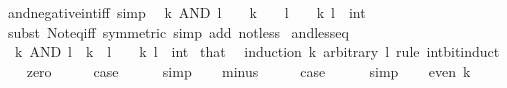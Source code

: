\begin{isabellebody}
\isamarkupfalse%
%
\endisatagproof
{\isafoldproof}%
%
\isadelimproof
\isanewline
%
\endisadelimproof
\isanewline
{}\isamarkupfalse%
\ and{\isacharunderscore}{\kern0pt}negative{\isacharunderscore}{\kern0pt}int{\isacharunderscore}{\kern0pt}iff\ {\isacharbrackleft}{\kern0pt}simp{\isacharbrackright}{\kern0pt}{\isacharcolon}{\kern0pt}\isanewline
\ \ {\isacartoucheopen}k\ AND\ l\ {\isacharless}{\kern0pt}\ {}\ {\isasymlongleftrightarrow}\ k\ {\isacharless}{\kern0pt}\ {}\ {\isasymand}\ l\ {\isacharless}{\kern0pt}\ {}{\isacartoucheclose}\ \ k\ l\ {\isacharcolon}{\kern0pt}{\isacharcolon}{\kern0pt}\ int\isanewline
%
\isadelimproof
\ \ %
\endisadelimproof
%
\isatagproof
{}\isamarkupfalse%
\ {\isacharparenleft}{\kern0pt}subst\ Not{\isacharunderscore}{\kern0pt}eq{\isacharunderscore}{\kern0pt}iff\ {\isacharbrackleft}{\kern0pt}symmetric{\isacharbrackright}{\kern0pt}{\isacharparenright}{\kern0pt}\ {\isacharparenleft}{\kern0pt}simp\ add{\isacharcolon}{\kern0pt}\ not{\isacharunderscore}{\kern0pt}less{\isacharparenright}{\kern0pt}%
\endisatagproof
{\isafoldproof}%
%
\isadelimproof
\isanewline
%
\endisadelimproof
\isanewline
{}\isamarkupfalse%
\ and{\isacharunderscore}{\kern0pt}less{\isacharunderscore}{\kern0pt}eq{\isacharcolon}{\kern0pt}\isanewline
\ \ {\isacartoucheopen}k\ AND\ l\ {\isasymle}\ k{\isacartoucheclose}\ \ {\isacartoucheopen}l\ {\isacharless}{\kern0pt}\ {}{\isacartoucheclose}\ \ k\ l\ {\isacharcolon}{\kern0pt}{\isacharcolon}{\kern0pt}\ int\isanewline
%
\isadelimproof
%
\endisadelimproof
%
\isatagproof
{}\isamarkupfalse%
\ that\ \isamarkupfalse%
\ {\isacharparenleft}{\kern0pt}induction\ k\ arbitrary{\isacharcolon}{\kern0pt}\ l\ rule{\isacharcolon}{\kern0pt}\ int{\isacharunderscore}{\kern0pt}bit{\isacharunderscore}{\kern0pt}induct{\isacharparenright}{\kern0pt}\isanewline
\ \ \isamarkupfalse%
\ zero\isanewline
\ \ \isamarkupfalse%
\ \isamarkupfalse%
\ {\isacharquery}{\kern0pt}case\isanewline
\ \ \ \ \isamarkupfalse%
\ simp\isanewline
{}\isamarkupfalse%
\isanewline
\ \ \isamarkupfalse%
\ minus\isanewline
\ \ \isamarkupfalse%
\ \isamarkupfalse%
\ {\isacharquery}{\kern0pt}case\isanewline
\ \ \ \ \isamarkupfalse%
\ simp\isanewline
{}\isamarkupfalse%
\isanewline
\ \ \isamarkupfalse%
\ {\isacharparenleft}{\kern0pt}even\ k{\isacharparenright}{\kern0pt}\isanewline

\end{isabellebody}
